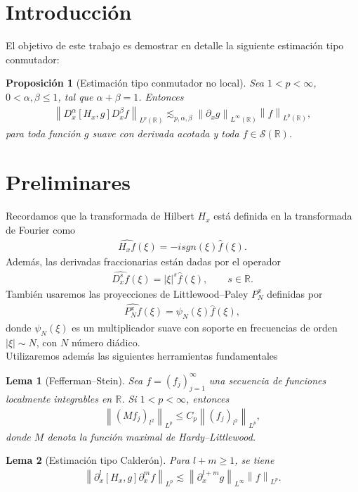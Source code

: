 \documentclass{aleph-revista}
\newtheorem{proposition}{Proposición}
\newtheorem{lemma}{Lema}
\renewcommand{\hat}{\widehat}
\providecommand{\norm}[1]{\left\|#1\right\|}
\begin{document}
\membrete
\section{Introducción}
El objetivo de este trabajo es demostrar en detalle la siguiente estimación tipo conmutador:
\begin{proposition}[Estimación tipo conmutador no local]
Sea $1 < p < \infty$, $0 < \alpha, \beta \leq 1$, tal que $\alpha + \beta = 1$. Entonces
\begin{align*}
  \norm{D_x^{\alpha} [H_x, g] D_x^{\beta} f}_{L^p(\mathbb{R})} \lesssim_{p,\alpha,\beta} \norm{\partial_x g}_{L^\infty(\mathbb{R})}\norm{f}_{L^p(\mathbb{R})}, 
\end{align*}
para toda función $g$ suave con derivada acotada y toda $f \in \mathcal{S}(\mathbb{R})$.
\end{proposition}
\section{Preliminares}
Recordamos que la transformada de Hilbert $H_x$ está definida en la transformada de Fourier como
\begin{align*}
  \hat{H_x f}(\xi) = -isgn(\xi) \hat{f}(\xi). 
\end{align*}
Además, las derivadas fraccionarias están dadas por el operador
\begin{align*}
  \hat{D_x^s f}(\xi) = |\xi|^s \hat{f}(\xi), \qquad s \in \mathbb{R}. 
\end{align*}
También usaremos las proyecciones de Littlewood–Paley $P^x_N$ definidas por
\begin{align*}
  \hat{P^x_N f}(\xi) = \psi_N(\xi) \hat{f}(\xi), 
\end{align*}
donde $\psi_N(\xi)$ es un multiplicador suave con soporte en frecuencias de orden $|\xi| \sim N$, con $N$ número diádico.\\
Utilizaremos además las siguientes herramientas fundamentales
\begin{lemma}[Fefferman–Stein]
  Sea $f = (f_j)_{j=1}^{\infty}$ una secuencia de funciones localmente integrables en $\mathbb{R}$. Si $1 < p < \infty$, entonces
  \begin{align*}
    \norm{(Mf_j)_{l^2}}_{L^p} \leq C_p \norm{(f_j)_{l^2}}_{L^p}, 
  \end{align*}
  donde $M$ denota la función maximal de Hardy–Littlewood.
\end{lemma}
\begin{lemma}[Estimación tipo Calderón]
  Para $l + m \geq 1$, se tiene
  \begin{align*}
    \norm{\partial_x^l [H_x, g] \partial_x^m f}_{L^p} \lesssim \norm{\partial_x^{l + m} g}_{L^\infty} \norm{f}_{L^p}. 
  \end{align*}
\end{lemma}
\end{document}
